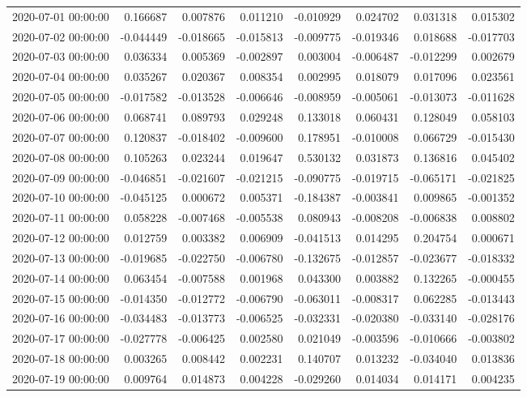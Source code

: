 \begin{tabular}{lrrrrrrr}
2020-07-01 00:00:00 & 0.166687 & 0.007876 & 0.011210 & -0.010929 & 0.024702 & 0.031318 & 0.015302 \\
2020-07-02 00:00:00 & -0.044449 & -0.018665 & -0.015813 & -0.009775 & -0.019346 & 0.018688 & -0.017703 \\
2020-07-03 00:00:00 & 0.036334 & 0.005369 & -0.002897 & 0.003004 & -0.006487 & -0.012299 & 0.002679 \\
2020-07-04 00:00:00 & 0.035267 & 0.020367 & 0.008354 & 0.002995 & 0.018079 & 0.017096 & 0.023561 \\
2020-07-05 00:00:00 & -0.017582 & -0.013528 & -0.006646 & -0.008959 & -0.005061 & -0.013073 & -0.011628 \\
2020-07-06 00:00:00 & 0.068741 & 0.089793 & 0.029248 & 0.133018 & 0.060431 & 0.128049 & 0.058103 \\
2020-07-07 00:00:00 & 0.120837 & -0.018402 & -0.009600 & 0.178951 & -0.010008 & 0.066729 & -0.015430 \\
2020-07-08 00:00:00 & 0.105263 & 0.023244 & 0.019647 & 0.530132 & 0.031873 & 0.136816 & 0.045402 \\
2020-07-09 00:00:00 & -0.046851 & -0.021607 & -0.021215 & -0.090775 & -0.019715 & -0.065171 & -0.021825 \\
2020-07-10 00:00:00 & -0.045125 & 0.000672 & 0.005371 & -0.184387 & -0.003841 & 0.009865 & -0.001352 \\
2020-07-11 00:00:00 & 0.058228 & -0.007468 & -0.005538 & 0.080943 & -0.008208 & -0.006838 & 0.008802 \\
2020-07-12 00:00:00 & 0.012759 & 0.003382 & 0.006909 & -0.041513 & 0.014295 & 0.204754 & 0.000671 \\
2020-07-13 00:00:00 & -0.019685 & -0.022750 & -0.006780 & -0.132675 & -0.012857 & -0.023677 & -0.018332 \\
2020-07-14 00:00:00 & 0.063454 & -0.007588 & 0.001968 & 0.043300 & 0.003882 & 0.132265 & -0.000455 \\
2020-07-15 00:00:00 & -0.014350 & -0.012772 & -0.006790 & -0.063011 & -0.008317 & 0.062285 & -0.013443 \\
2020-07-16 00:00:00 & -0.034483 & -0.013773 & -0.006525 & -0.032331 & -0.020380 & -0.033140 & -0.028176 \\
2020-07-17 00:00:00 & -0.027778 & -0.006425 & 0.002580 & 0.021049 & -0.003596 & -0.010666 & -0.003802 \\
2020-07-18 00:00:00 & 0.003265 & 0.008442 & 0.002231 & 0.140707 & 0.013232 & -0.034040 & 0.013836 \\
2020-07-19 00:00:00 & 0.009764 & 0.014873 & 0.004228 & -0.029260 & 0.014034 & 0.014171 & 0.004235 \\

\end{tabular}
